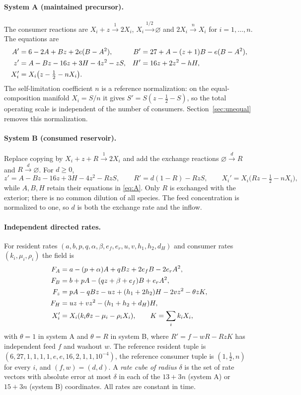 \documentclass[11pt,a4paper]{article}
\theoremstyle{plain}
\theoremstyle{definition}
\theoremstyle{remark}
\begin{document}
\paragraph{System A (maintained precursor).}
The consumer reactions are $X_i+z\xrightarrow{1}2X_i$, $X_i\xrightarrow{1/2}\varnothing$ and $2X_i\xrightarrow{n}X_i$ for $i=1,\dots,n$. The equations are
\begin{align}
A'&=6-2A+Bz+2e(B-A^2),& B'&=27+A-(z+1)B-e(B-A^2),\notag\\
z'&=A-Bz-16z+3H-4z^2-zS,& H'&=16z+2z^2-hH,\label{eq:A}\\
X_i'&=X_i\bigl(z-\tfrac12-nX_i\bigr).&&\notag
\end{align}
The self-limitation coefficient $n$ is a reference normalization: on the equal-composition manifold $X_i=S/n$ it gives $S'=S(z-\tfrac12-S)$, so the total operating scale is independent of the number of consumers. Section~\ref{sec:unequal} removes this normalization.

\paragraph{System B (consumed reservoir).}
Replace copying by $X_i+z+R\xrightarrow{1}2X_i$ and add the exchange reactions $\varnothing\xrightarrow{d}R$ and $R\xrightarrow{d}\varnothing$. For $d\ge0$,
\begin{equation}\label{eq:B}
z'=A-Bz-16z+3H-4z^2-RzS,\qquad
R'=d(1-R)-RzS,\qquad X_i'=X_i\bigl(Rz-\tfrac12-nX_i\bigr),
\end{equation}
while $A,B,H$ retain their equations in \eqref{eq:A}. Only $R$ is exchanged with the exterior; there is no common dilution of all species. The feed concentration is normalized to one, so $d$ is both the exchange rate and the inflow.

\paragraph{Independent directed rates.}
For resident rates $(a,b,p,q,\alpha,\beta,e_f,e_r,u,v,h_1,h_2,d_H)$ and consumer rates $(k_i,\mu_i,\rho_i)$ the field is
\begin{align}
F_A&=a-(p+\alpha)A+qBz+2e_fB-2e_rA^2,\notag\\
F_B&=b+pA-(qz+\beta+e_f)B+e_rA^2,\notag\\
F_z&=pA-qBz-uz+(h_1+2h_2)H-2vz^2-\theta zK,\label{eq:rates}\\
F_H&=uz+vz^2-(h_1+h_2+d_H)H,\notag\\
X_i'&=X_i(k_i\theta z-\mu_i-\rho_iX_i),\qquad K=\sum_ik_iX_i,\notag
\end{align}
with $\theta=1$ in system A and $\theta=R$ in system B, where $R'=f-wR-RzK$ has independent feed $f$ and washout $w$. The reference resident tuple is $(6,27,1,1,1,1,e,e,16,2,1,1,10^{-4})$, the reference consumer tuple is $(1,\tfrac12,n)$ for every $i$, and $(f,w)=(d,d)$. A \emph{rate cube of radius $\delta$} is the set of rate vectors with absolute error at most $\delta$ in each of the $13+3n$ (system A) or $15+3n$ (system B) coordinates. All rates are constant in time.
\end{document}
